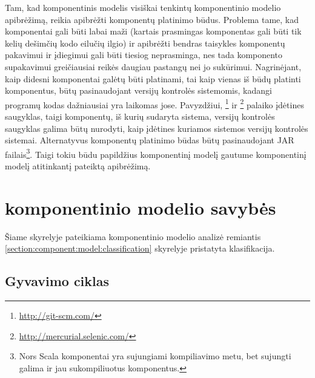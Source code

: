 Tam, kad  komponentinis modelis visiškai tenkintų
komponentinio modelio apibrėžimą, reikia apibrėžti komponentų
platinimo būdus. Problema tame, kad  komponentai
gali būti labai maži (kartais prasmingas komponentas gali būti tik
kelių dešimčių kodo eilučių ilgio) ir apibrėžti bendras taisykles
komponentų pakavimui ir įdiegimui gali būti tiesiog neprasminga,
nes tada komponento supakavimui greičiausiai reikės daugiau pastangų
nei jo sukūrimui. Nagrinėjant, kaip didesni komponentai galėtų
būti platinami, tai kaip vienas iš būdų platinti 
komponentus, būtų pasinaudojant versijų kontrolės sistemomis,
kadangi programų kodas dažniausiai yra laikomas jose. Pavyzdžiui,
\footnote{\url{http://git-scm.com/}} ir
\footnote{\url{http://mercurial.selenic.com/}} palaiko
įdėtines saugyklas, taigi komponentų, iš kurių sudaryta sistema,
versijų kontrolės saugyklas galima būtų nurodyti, kaip įdėtines
kuriamos sistemos versijų kontrolės sistemai. Alternatyvus komponentų
platinimo būdas būtų pasinaudojant JAR failais\footnote{Nors Scala
komponentai yra sujungiami kompiliavimo metu, bet sujungti galima ir jau
sukompiliuotus komponentus.}. Taigi tokiu būdu papildžius
 komponentinį modelį gautume komponentinį modelį
atitinkantį \cite[37]{heineman2001component} pateiktą apibrėžimą.

\section{ komponentinio modelio savybės}

Šiame skyrelyje pateikiama  komponentinio modelio
analizė remiantis \ref{section:component:model:classification}
skyrelyje pristatyta \cite{classification-framework-for-scm}
klasifikacija.

\subsection{Gyvavimo ciklas}

